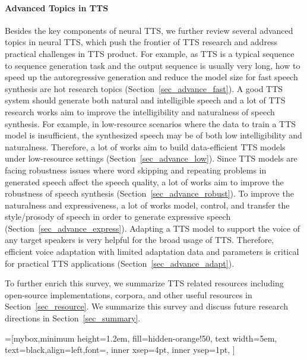 \documentclass{article}
\begin{document}
\paragraph{Advanced Topics in TTS} Besides the key components of neural TTS, we further review several advanced topics in neural TTS, which push the frontier of TTS research and address practical challenges in TTS product. For example, as TTS is a typical sequence to sequence generation task and the output sequence is usually very long, how to speed up the autoregressive generation and reduce the model size for fast speech synthesis are hot research topics (Section~\ref{sec_advance_fast}). A good TTS system should generate both natural and intelligible speech and a lot of TTS research works aim to improve the intelligibility and naturalness of speech synthesis. For example, in low-resource scenarios where the data to train a TTS model is insufficient, the synthesized speech may be of both low intelligibility and naturalness. Therefore, a lot of works aim to build data-efficient TTS models under low-resource settings (Section~\ref{sec_advance_low}). Since TTS models are facing robustness issues where word skipping and repeating problems in generated speech affect the speech quality, a lot of works aim to improve the robustness of speech synthesis (Section~\ref{sec_advance_robust}). To improve the naturalness and expressiveness, a lot of works model, control, and transfer the style/prosody of speech in order to generate expressive speech (Section~\ref{sec_advance_express}). Adapting a TTS model to support the voice of any target speakers is very helpful for the broad usage of TTS. Therefore, efficient voice adaptation with limited adaptation data and parameters is critical for practical TTS applications (Section~\ref{sec_advance_adapt}). 

To further enrich this survey, we summarize TTS related resources including open-source implementations, corpora, and other useful resources in Section~\ref{sec_resource}. We summarize this survey and discuss future research directions in Section~\ref{sec_summary}. 




=[mybox,minimum height=1.2em,
fill=hidden-orange!50, text width=5em,  text=black,align=left,font=\footnotesize,
inner xsep=4pt,
inner ysep=1pt,
]
\end{document}
